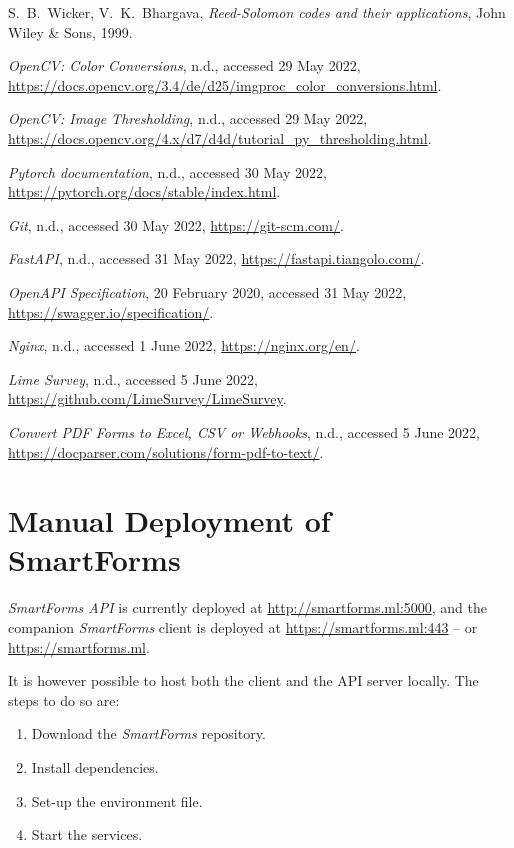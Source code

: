 \documentclass[11pt, a4paper]{report}
\begin{document}
\begin{thebibliography}{99}
S.~B.~Wicker, V.~K.~Bhargava,
\emph{Reed-Solomon codes and their applications},
John Wiley \& Sons, 1999.

\emph{OpenCV: Color Conversions}, n.d., accessed 29 May 2022,  \url{https://docs.opencv.org/3.4/de/d25/imgproc\_color\_conversions.html}.

\emph{OpenCV: Image Thresholding}, n.d., accessed 29 May 2022,
\url{https://docs.opencv.org/4.x/d7/d4d/tutorial\_py\_thresholding.html}.

\emph{Pytorch documentation}, n.d., accessed 30 May 2022,
\url{https://pytorch.org/docs/stable/index.html}.

\emph{Git}, n.d., accessed 30 May 2022,
\url{https://git-scm.com/}.

\emph{FastAPI}, n.d., accessed 31 May 2022,
\url{https://fastapi.tiangolo.com/}.

\emph{OpenAPI Specification}, 20 February 2020, accessed 31 May 2022,
\url{https://swagger.io/specification/}.

\emph{Nginx}, n.d., accessed 1 June 2022, 
\url{https://nginx.org/en/}.

\emph{Lime Survey}, n.d., accessed 5 June 2022,
\url{https://github.com/LimeSurvey/LimeSurvey}.

\emph{Convert PDF Forms to Excel, CSV or Webhooks}, n.d., accessed 5 June 2022,
\url{https://docparser.com/solutions/form-pdf-to-text/}.

\end{thebibliography}


\appendix
\chapter{Manual Deployment of SmartForms}
\label{appendix-links}

\textit{SmartForms API} is currently deployed at \url{http://smartforms.ml:5000}, and the companion \textit{SmartForms} client is deployed at \url{https://smartforms.ml:443} -- or \url{https://smartforms.ml}.

It is however possible to host both the client and the API server locally. The steps to do so are:
\begin{enumerate}
	\item Download the \textit{SmartForms} repository.
	\item Install dependencies.
	\item Set-up the environment file.
	\item Start the services.
\end{enumerate}
\end{document}
